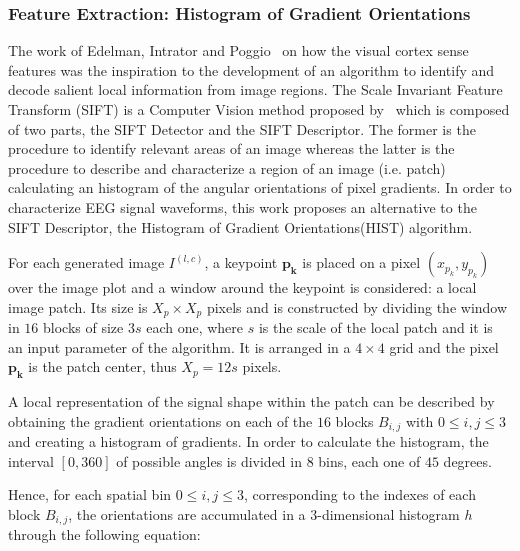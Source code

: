 \documentclass[utf8]{frontiersSCNS} %
\begin{document}
\subsubsection{Feature Extraction: Histogram of Gradient Orientations}
\label{SIFT}

The work of Edelman, Intrator and Poggio~\citep{cogprints561} on how the visual cortex sense features was the inspiration to the development of an algorithm to identify and decode salient local information from image regions.  The Scale Invariant Feature Transform (SIFT) is a Computer Vision method proposed by~\cite{Lowe2004} which is composed of two parts, the SIFT Detector and the SIFT Descriptor.  The former is the procedure to identify relevant areas of an image whereas the latter is the procedure to describe and characterize a region of an image (i.e. patch) calculating an histogram of the angular orientations of pixel gradients.  In order to characterize EEG signal waveforms, this work proposes an alternative to the SIFT Descriptor, the Histogram of Gradient Orientations(HIST) algorithm.  



For each generated image $I^{(l,c)}$, a keypoint $\mathbf{p_k}$ is placed on a pixel $(x_{p_k}, y_{p_k})$ over the image plot and a window around the keypoint is considered: a local image patch. Its size is $X_p \times X_p$ pixels and is constructed by dividing the window in $16$ blocks of size $3s$ each one,  where $s$ is the scale of the local patch and it is an input parameter of the algorithm. It is arranged in a $4 \times 4$ grid and the pixel $ \mathbf{p_k}$ is the patch center, thus $X_p = 12s $ pixels. 

A local representation of the signal shape within the patch can be described by obtaining the gradient orientations on each of the $16$ blocks $B_{i,j}$  with $ 0 \leq i,j \leq 3$ and creating a histogram of gradients.  In order to calculate the histogram, the interval $[0,360]$ of possible angles is divided in $8$ bins, each one of $45$ degrees.

 Hence, for each spatial bin $ 0 \leq i,j \leq 3$, corresponding to the indexes of each block $B_{i,j}$,  the orientations are accumulated in a  $3$-dimensional histogram $h$ through the following equation: 
 
\end{document}
